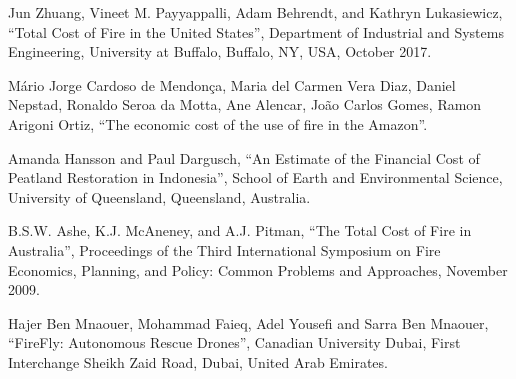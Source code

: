 \documentclass[conference]{IEEEtran}
\begin{document}
\begin{thebibliography}{00}
 Jun Zhuang, Vineet M. Payyappalli, Adam Behrendt,
and Kathryn Lukasiewicz, ``Total Cost of Fire in the United States'', Department of Industrial and Systems Engineering, University at Buffalo, Buffalo, NY, USA, October 2017.

 Mário Jorge Cardoso de Mendonça, Maria del Carmen Vera Diaz,
Daniel Nepstad, Ronaldo Seroa da Motta, Ane Alencar, João Carlos Gomes, Ramon Arigoni Ortiz, ``The economic cost of the use of fire in the Amazon''.

 Amanda Hansson and Paul Dargusch, ``An Estimate of the Financial Cost of Peatland Restoration in Indonesia'', School of Earth and Environmental Science, University of Queensland, Queensland, Australia.

 B.S.W. Ashe, K.J. McAneney, and A.J. Pitman, ``The Total Cost of Fire in Australia'', Proceedings of the Third International Symposium on Fire Economics, Planning, and Policy: Common Problems and Approaches, November 2009.

 Hajer Ben Mnaouer, Mohammad Faieq, Adel Yousefi and Sarra Ben Mnaouer, ``FireFly: Autonomous Rescue Drones'', Canadian University Dubai, First Interchange Sheikh Zaid Road, Dubai, United Arab Emirates.





\end{thebibliography}
\end{document}
